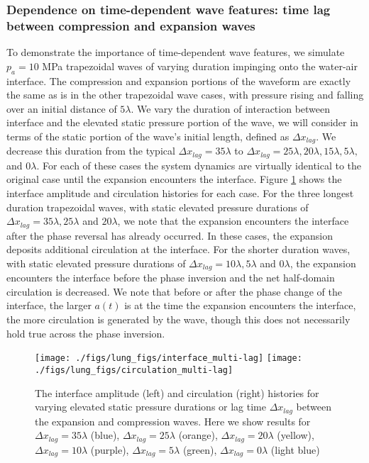 \subsubsection{Dependence on time-dependent wave features: time lag between compression and expansion waves}
To demonstrate the importance of time-dependent wave features, we
simulate $p_a=10$ MPa trapezoidal waves of varying duration impinging
onto the water-air interface. The compression and expansion portions
of the waveform are exactly the same as is in the other trapezoidal
wave cases, with pressure rising and falling over an initial distance
of $5\lambda$. We vary the duration of interaction between interface
and the elevated static pressure portion of the wave, we will consider
in terms of the static portion of the wave's initial length, defined
as $\Delta x_{lag}$. We decrease this duration from the typical
$\Delta x_{lag}=35\lambda$ to
$\Delta x_{lag}=25\lambda, 20\lambda, 15\lambda, 5\lambda,$ and
$0\lambda$. For each of these cases the system dynamics are virtually
identical to the original case until the expansion encounters the
interface. Figure \ref{fig:trapz_circ_interface_multi-lag} shows the
interface amplitude and circulation histories for each case. For the
three longest duration trapezoidal waves, with static elevated
pressure durations of $\Delta x_{lag}=35\lambda, 25\lambda$ and
$20\lambda$, we note that the expansion encounters the interface after
the phase reversal has already occurred. In these cases, the expansion
deposits additional circulation at the interface. For the shorter
duration waves, with static elevated pressure durations of
$\Delta x_{lag}=10\lambda, 5\lambda$ and $0\lambda$, the expansion
encounters the interface before the phase inversion and the net
half-domain circulation is decreased. We note that before or after the
phase change of the interface, the larger $a(t)$ is at the time the
expansion encounters the interface, the more circulation is generated
by the wave, though this does not necessarily hold true across the
phase inversion.
%
\begin{figure}[h] 
  \centering
  \texttt{[image: ./figs/lung\_figs/interface\_multi-lag]}
  \texttt{[image: ./figs/lung\_figs/circulation\_multi-lag]}
  \caption[The interface and circulation dependence on wave duration]{The interface amplitude (left) and circulation (right)
    histories for varying elevated static pressure durations or lag
    time $\Delta x_{lag}$ between the expansion and compression
    waves. Here we show results for $\Delta x_{lag}=35\lambda$ (blue),
    $\Delta x_{lag}=25\lambda$ (orange), $\Delta x_{lag}=20\lambda$
    (yellow), $\Delta x_{lag}=10\lambda$ (purple),
    $\Delta x_{lag}=5\lambda$ (green), $\Delta x_{lag}=0\lambda$
    (light blue)}
  \label{fig:trapz_circ_interface_multi-lag}
\end{figure}
%
